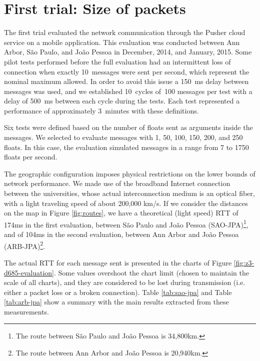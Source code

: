 


\section{First trial: Size of packets}

The first trial evaluated the network communication through the Pusher cloud service on a mobile application.
This evaluation was conducted between Ann Arbor, São Paulo, and João Pessoa in December, 2014, and January, 2015.
Some pilot tests performed before the full evaluation had an intermittent loss of connection when exactly 10~messages were sent per second, which represent the nominal maximum allowed.
In order to avoid this issue a 150~ms delay between messages was used, and we established 10~cycles of~100 messages per test with a delay of 500~ms between each cycle during the tests.
Each test represented a performance of approximately 3~minutes with these definitions.

Six tests were defined based on the number of floats sent as arguments inside the messages.
We selected to evaluate messages with 1, 50, 100, 150, 200, and 250 floats.
In this case, the evaluation simulated messages in a range from 7 to 1750 floats per second.

The geographic configuration imposes physical restrictions on the lower bounds of network performance.
We made use of the broadband Internet connection between the universities, whose actual interconnection medium is an optical fiber, with a light traveling speed of about 200,000 km/s.
If we consider the distances on the map in Figure \ref{fig:routes}, we have a theoretical (light speed) RTT of 174ms in the first evaluation, between S\~{a}o Paulo and Jo\~{a}o Pessoa (SAO-JPA)\footnote{The route between S\~{a}o Paulo and Jo\~{a}o Pessoa is 34,800km.}, and of 104ms in the second evaluation, between Ann Arbor and Jo\~{a}o Pessoa (ARB-JPA)\footnote{The route between Ann Arbor and Jo\~{a}o Pessoa is 20,940km.}.

The actual RTT for each message sent is presented in the charts of Figure \ref{fig:z3-d685-evaluation}.
Some values overshoot the chart limit (chosen to maintain the scale of all charts), and they are considered to be lost during transmission (i.e. either a packet loss or a broken connection). 
Table \ref{tab:sao-jpa} and Table \ref{tab:arb-jpa} show a summary with the main results extracted from these measurements.


